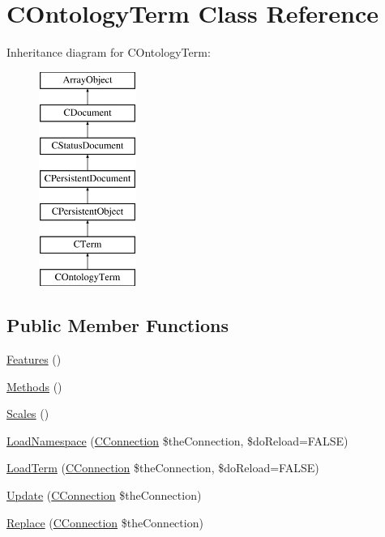 \hypertarget{class_c_ontology_term}{\section{C\-Ontology\-Term Class Reference}
\label{class_c_ontology_term}
}
Inheritance diagram for C\-Ontology\-Term\-:\begin{figure}[H]
\begin{center}
\leavevmode
\includegraphics[height=7.000000cm]{class_c_ontology_term}
\end{center}
\end{figure}
\subsection*{Public Member Functions}
\begin{DoxyCompactItemize}
\item 
\hyperlink{class_c_ontology_term_af016ba966a7b3c9ce30724d0a9394af2}{Features} ()
\item 
\hyperlink{class_c_ontology_term_ae6beb36dde46c78f136e923c6dda99d9}{Methods} ()
\item 
\hyperlink{class_c_ontology_term_a0885898fdebb262a7ae71ec010249d46}{Scales} ()
\item 
\hyperlink{class_c_ontology_term_a31fa356129d058361b7cdd88924b6c7d}{Load\-Namespace} (\hyperlink{class_c_connection}{C\-Connection} \$the\-Connection, \$do\-Reload=F\-A\-L\-S\-E)
\item 
\hyperlink{class_c_ontology_term_a36c2ab4ffdde63d0ca51734437faaa35}{Load\-Term} (\hyperlink{class_c_connection}{C\-Connection} \$the\-Connection, \$do\-Reload=F\-A\-L\-S\-E)
\item 
\hyperlink{class_c_ontology_term_ac39334977998a1e11c0e277eac4cef5c}{Update} (\hyperlink{class_c_connection}{C\-Connection} \$the\-Connection)
\item 
\hyperlink{class_c_ontology_term_ac1257616ac8626822f410bd858ce767c}{Replace} (\hyperlink{class_c_connection}{C\-Connection} \$the\-Connection)
\end{DoxyCompactItemize}

